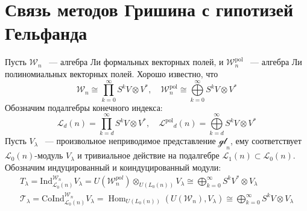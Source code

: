 \documentclass[12pt,a4paper]{article}
\newcommand{\Wpn}{\ensuremath{\mathcal{W}^{\mathrm{pol}}_n}}
\newcommand{\Wn}{\ensuremath{\mathcal{W}_n}}
\newcommand{\Lp}{\ensuremath{\mathcal{L}^{\mathrm{pol}}}}
\renewcommand{\L}{\ensuremath{\mathcal{L}}}
\begin{document}
    \section{Связь методов Гришина с гипотизей Гельфанда}
    Пусть $\Wn$ ~--- алгебра Ли формальных векторных полей, и $\Wpn$ ~--- алгебра Ли полиномиальных векторных полей.
    Хорошо известно, что
    \[
        \Wn \cong \prod\limits_{k=0}^{\infty} S^k V\otimes V^*, \quad \Wpn \cong \bigoplus\limits_{k=0}^{\infty} S^k V\otimes V^*
    \]
    Обозначим подалгебры конечного индекса:
    \[
        \L_d(n) = \prod\limits_{k=d}^{\infty} S^k V\otimes V^*, \quad \Lp_d(n) = \bigoplus\limits_{k=d}^{\infty} S^k V\otimes V^*
    \]
    Пусть $V_{\lambda}$ ~--- произвольное неприводимое представление $\mathcal{gl}_n$, ему соответствует $\L_0(n)$-модуль $V_{\lambda}$ и тривиальное действие на подалгебре $\L_1(n)\subset\L_0(n)$.
    Обозначим индуцированный и коиндуцированный модули:
    \begin{gather*}
        T_{\lambda} = \mathrm{Ind}^{\Wn}_{\L_0(n)} V_{\lambda} =  U(\mathcal{W}_n^{pol}) \otimes_{U(L_0(n))} V_{\lambda} \cong \bigoplus_{k=0}^{\infty} S^k V^* \otimes V_{\lambda} \\
        \mathcal{T}_{\lambda} = \mathrm{CoInd}^{\Wn}_{\L_0(n)} V_{\lambda} = \operatorname{Hom}_{U(L_0(n))}(U(\mathcal{W}_n), V_{\lambda}) \cong \bigoplus_{k=0}^{\infty} S^k V \otimes V_{\lambda}\\
    \end{gather*}



    \printbibliography
\end{document}
